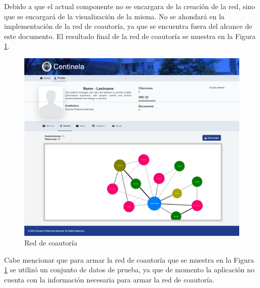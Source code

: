 Debido a que el actual componente no se encargara de la creación de la red, sino que se encargará de la visualización de la misma. No se ahondará en la implementación de la red de coautoría, ya que se encuentra fuera del alcance de este documento.
El resultado final de la red de coautoría se muestra en la Figura \ref{fig:network-coauthors}.
\begin{figure}[H]
    \centering
    \includegraphics[scale=0.25]{../02Figures/02Chapter/Sprints/Sprint-2/network-coauthors.jpeg}
    \caption{Red de coautoría}
    \label{fig:network-coauthors}
\end{figure}

Cabe mencionar que para armar la red de coautoría que se muestra en la Figura \ref{fig:network-coauthors} se utilizó un conjunto de datos de prueba, ya que  de momento la aplicación no cuenta con la información necesaria para armar la red de coautoría.

